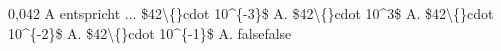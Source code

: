     {0,042 A entspricht ...}
    {\$42\textbackslash\{\}cdot 10\textasciicircum{}\{-3\}\$ A.}
    {\$42\textbackslash\{\}cdot 10\textasciicircum{}3\$ A.}
    {\$42\textbackslash\{\}cdot 10\textasciicircum{}\{-2\}\$ A.}
    {\$42\textbackslash\{\}cdot 10\textasciicircum{}\{-1\}\$ A.}
    {false}{false}